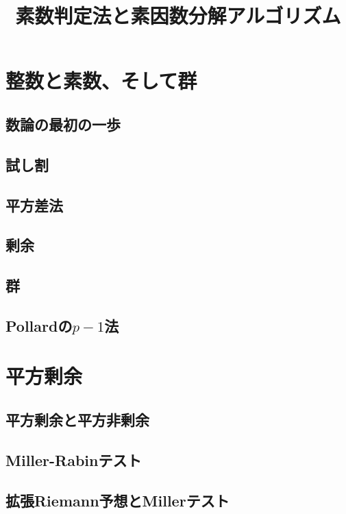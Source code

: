 
\title{素数判定法と素因数分解アルゴリズム}
\author{}
\date{}
\makeindex

\setcounter{notesNum}{1}
\maketitle
\begin{multicols}{2}
\setcounter{tocdepth}{2}
\tableofcontents
\end{multicols}
\newpage

\section{整数と素数、そして群}
\subsection{数論の最初の一歩}

\subsection{試し割}

\subsection{平方差法}

\subsection{剰余}

\subsection{群}

\subsection{Pollardの$p-1$法}


\section{平方剰余}
\subsection{平方剰余と平方非剰余}

\subsection{Miller-Rabinテスト}

\subsection{拡張Riemann予想とMillerテスト}


